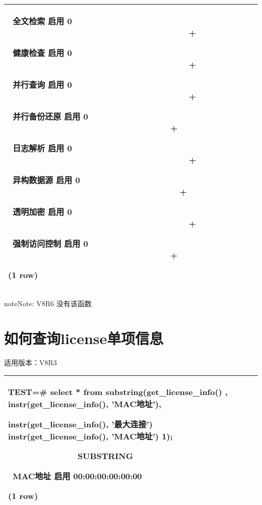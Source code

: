 \documentclass[a4,10pt,oneside,english]{sphinxmanual}
\begin{document}
\begin{savenotes}
\begin{tabulary}{\linewidth}[t]{|T|}
 全文检索 \sphinxhyphen{}\sphinxhyphen{}\sphinxhyphen{} 启用 \sphinxhyphen{}\sphinxhyphen{}\sphinxhyphen{} 0                                        +

 健康检查 \sphinxhyphen{}\sphinxhyphen{}\sphinxhyphen{} 启用 \sphinxhyphen{}\sphinxhyphen{}\sphinxhyphen{} 0                                        +

 并行查询 \sphinxhyphen{}\sphinxhyphen{}\sphinxhyphen{} 启用 \sphinxhyphen{}\sphinxhyphen{}\sphinxhyphen{} 0                                        +

 并行备份还原 \sphinxhyphen{}\sphinxhyphen{}\sphinxhyphen{} 启用 \sphinxhyphen{}\sphinxhyphen{}\sphinxhyphen{} 0                                    +

 日志解析 \sphinxhyphen{}\sphinxhyphen{}\sphinxhyphen{} 启用 \sphinxhyphen{}\sphinxhyphen{}\sphinxhyphen{} 0                                        +

 异构数据源 \sphinxhyphen{}\sphinxhyphen{}\sphinxhyphen{} 启用 \sphinxhyphen{}\sphinxhyphen{}\sphinxhyphen{} 0                                      +

 透明加密 \sphinxhyphen{}\sphinxhyphen{}\sphinxhyphen{} 启用 \sphinxhyphen{}\sphinxhyphen{}\sphinxhyphen{} 0                                        +

 强制访问控制 \sphinxhyphen{}\sphinxhyphen{}\sphinxhyphen{} 启用 \sphinxhyphen{}\sphinxhyphen{}\sphinxhyphen{} 0                                    +

(1 row)
\\
\hline
\end{tabulary}
\par
\sphinxattableend\end{savenotes}

\begin{sphinxadmonition}{note}{Note:}
V8R6 没有该函数
\end{sphinxadmonition}


\section{如何查询license单项信息}
\label{\detokenize{license:id3}}
适用版本：V8R3


\begin{savenotes}\sphinxattablestart
\centering
\begin{tabulary}{\linewidth}[t]{|T|}
\hline

TEST=\# select * from substring(get\_license\_info() ,
instr(get\_license\_info(), 'MAC地址'),

instr(get\_license\_info(), '最大连接') \sphinxhyphen{} instr(get\_license\_info(),
'MAC地址') \sphinxhyphen{} 1);

               SUBSTRING

 MAC地址 \sphinxhyphen{}\sphinxhyphen{}\sphinxhyphen{} 启用 \sphinxhyphen{}\sphinxhyphen{}\sphinxhyphen{} 00:00:00:00:00:00

(1 row)
\\
\hline
\end{tabulary}
\par
\sphinxattableend\end{savenotes}
\end{document}
